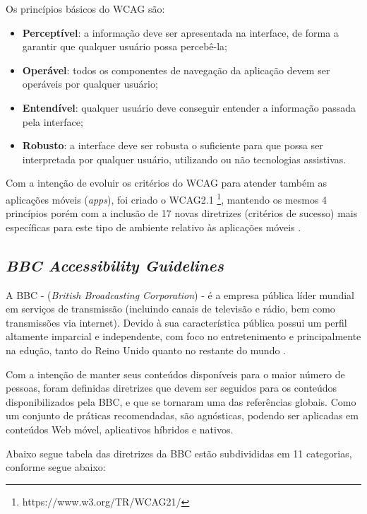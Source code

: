\documentclass[
	12pt,				%
	oneside,			%
	a4paper,			%
	english,			%
	brazil				%
	]{abntex2ppgsi}
\begin{document}
Os princípios básicos do WCAG são:

\begin{itemize}
	\item \textbf{Perceptível}: a informação deve ser apresentada na interface, de forma a garantir que qualquer usuário possa percebê-la;
	\item \textbf{Operável}: todos os componentes de navegação da aplicação devem ser operáveis por qualquer usuário;
	\item \textbf{Entendível}: qualquer usuário deve conseguir entender a informação passada pela interface;
	\item \textbf{Robusto}: a interface deve ser robusta o suficiente para que possa ser interpretada por qualquer usuário, utilizando ou não tecnologias assistivas.
\end{itemize}

Com a intenção de evoluir os critérios do WCAG para atender também as aplicações móveis (\textit{apps}), foi criado o WCAG2.1 \footnote{https://www.w3.org/TR/WCAG21/}, mantendo os mesmos 4 princípios porém com a inclusão de 17 novas diretrizes (critérios de sucesso) mais específicas para este tipo de ambiente relativo às aplicações móveis \cite{shanley}.


\subsection{\textit{BBC Accessibility Guidelines}}
A BBC - (\textit{British Broadcasting Corporation}) \cite{bbc} - é a empresa pública líder mundial em serviços de transmissão (incluindo canais de televisão e rádio, bem como transmissões via internet). Devido à sua característica pública possui um perfil altamente imparcial e independente, com foco no entretenimento e principalmente na edução, tanto do Reino Unido quanto no restante do mundo \cite{bbchomepage}.

Com a intenção de manter seus conteúdos disponíveis para o maior número de pessoas, foram definidas diretrizes que devem ser seguidos para os conteúdos disponibilizados pela BBC, e que se tornaram uma das referências globais. Como um conjunto de práticas recomendadas, são agnósticas, podendo ser aplicadas em conteúdos Web móvel, aplicativos híbridos e nativos.

Abaixo segue tabela das diretrizes da BBC estão subdivididas em 11 categorias, conforme segue abaixo:
\end{document}
